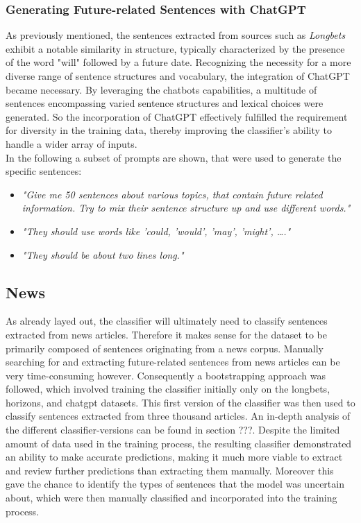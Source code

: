 \documentclass[a4paper,12pt]{report} %
\begin{document}
\subsubsection{Generating Future-related Sentences with ChatGPT}
As previously mentioned, the sentences extracted from sources such as \textit{Longbets} exhibit a notable similarity in structure, typically characterized by the presence of the word "will" followed by a future date. Recognizing the necessity for a more diverse range of sentence structures and vocabulary, the integration of ChatGPT became necessary. By leveraging the chatbots capabilities, a multitude of sentences encompassing varied sentence structures and lexical choices were generated. So the incorporation of ChatGPT effectively fulfilled the requirement for diversity in the training data, thereby improving the classifier's ability to handle a wider array of inputs. \\

In the following a subset of prompts are shown, that were used to generate the specific sentences:
\begin{itemize}
  \item \textit{"Give me 50 sentences about various topics, that contain future related information. Try to mix their sentence structure up and use different words."}
  \item \textit{"They should use words like 'could, 'would', 'may', 'might', …."}
  \item \textit{"They should be about two lines long."}
\end{itemize}

\subsection{News}
As already layed out, the classifier will ultimately need to classify sentences extracted from news articles. Therefore it makes sense for the dataset to be primarily composed of sentences originating from a news corpus. Manually searching for and extracting future-related sentences from news articles can be very time-consuming however. Consequently a bootstrapping approach was followed, which involved training the classifier initially only on the longbets, horizons, and chatgpt datasets. This first version of the classifier was then used to classify sentences extracted from three thousand articles. An in-depth analysis of the different classifier-versions can be found in section ???.
Despite the limited amount of data used in the training process, the resulting classifier demonstrated an ability to make accurate predictions, making it much more viable to extract and review further predictions than extracting them manually. Moreover this gave the chance to identify the types of sentences that the model was uncertain about, which were then manually classified and incorporated into the training process.
\end{document}

